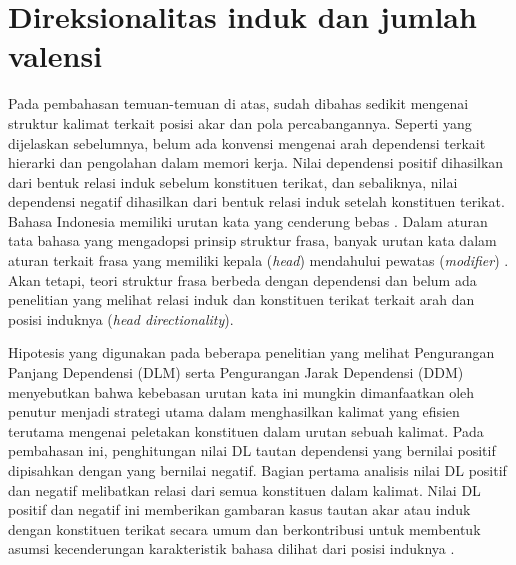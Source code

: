 \section{Direksionalitas induk dan jumlah valensi}
Pada pembahasan temuan-temuan di atas, sudah dibahas sedikit mengenai struktur kalimat terkait posisi akar dan pola percabangannya. Seperti yang dijelaskan sebelumnya, belum ada konvensi mengenai arah dependensi terkait hierarki dan pengolahan dalam memori kerja. Nilai dependensi positif dihasilkan dari bentuk relasi induk sebelum konstituen terikat, dan sebaliknya, nilai dependensi negatif dihasilkan dari bentuk relasi induk setelah konstituen terikat. Bahasa Indonesia memiliki urutan kata yang cenderung bebas \citep{sneddon2010indonesian}. Dalam aturan tata bahasa yang mengadopsi prinsip struktur frasa, banyak urutan kata dalam aturan terkait frasa yang memiliki kepala (\textit{head}) mendahului pewatas (\textit{modifier}) \citep{sneddon2010indonesian}. Akan tetapi, teori struktur frasa berbeda dengan dependensi dan belum ada penelitian yang melihat relasi induk dan konstituen terikat terkait arah dan posisi induknya (\textit{head directionality}). 

Hipotesis yang digunakan pada beberapa penelitian yang melihat Pengurangan Panjang Dependensi (DLM) \citep{futrell2015large} serta Pengurangan Jarak Dependensi (DDM) \citep{liu2017dependency} menyebutkan bahwa kebebasan urutan kata ini mungkin dimanfaatkan oleh penutur menjadi strategi utama dalam menghasilkan kalimat yang efisien terutama mengenai peletakan konstituen dalam urutan sebuah kalimat. Pada pembahasan ini, penghitungan nilai DL tautan dependensi yang bernilai positif dipisahkan dengan yang bernilai negatif. Bagian pertama analisis nilai DL positif dan negatif melibatkan relasi dari semua konstituen dalam kalimat. Nilai DL positif dan negatif ini memberikan gambaran kasus tautan akar atau induk dengan konstituen terikat secara umum dan berkontribusi untuk membentuk asumsi kecenderungan karakteristik bahasa dilihat dari posisi induknya \citep{wang2017effects}. 

